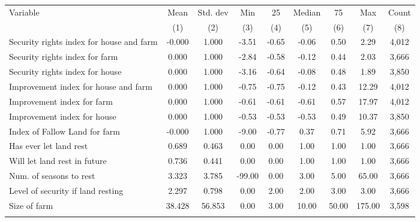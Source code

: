 \begin{tabular}{lcccccccc}
\hline \noalign{\smallskip}Variable & Mean & Std. dev & Min & 25 & Median & 75 & Max & Count\\
 & (1) & (2) & (3) & (4) & (5) & (6) & (7) & (8)\\
\noalign{\smallskip}\hline \noalign{\smallskip}Security rights index for house and farm & -0.000 & 1.000 & -3.51 & -0.65 & -0.06 & 0.50 & 2.29 & 4,012\\
\quad Security rights index for farm & 0.000 & 1.000 & -2.84 & -0.58 & -0.12 & 0.44 & 2.03 & 3,666\\
\quad Security rights index for house & 0.000 & 1.000 & -3.16 & -0.64 & -0.08 & 0.48 & 1.89 & 3,850\\
Improvement index for house and farm & 0.000 & 1.000 & -0.75 & -0.75 & -0.12 & 0.43 & 12.29 & 4,012\\
\quad Improvement index for farm & 0.000 & 1.000 & -0.61 & -0.61 & -0.61 & 0.57 & 17.97 & 4,012\\
\quad Improvement index for house & 0.000 & 1.000 & -0.53 & -0.53 & -0.53 & 0.49 & 10.37 & 3,850\\
Index of Fallow Land for farm & -0.000 & 1.000 & -9.00 & -0.77 & 0.37 & 0.71 & 5.92 & 3,666\\
\quad Has ever let land rest & 0.689 & 0.463 & 0.00 & 0.00 & 1.00 & 1.00 & 1.00 & 3,666\\
\quad Will let land rest in future & 0.736 & 0.441 & 0.00 & 0.00 & 1.00 & 1.00 & 1.00 & 3,666\\
\quad Num. of seasons to rest & 3.323 & 3.785 & -99.00 & 0.00 & 3.00 & 5.00 & 65.00 & 3,666\\
\quad Level of security if land resting & 2.297 & 0.798 & 0.00 & 2.00 & 2.00 & 3.00 & 3.00 & 3,666\\
Size of farm & 38.428 & 56.853 & 0.00 & 3.00 & 10.00 & 50.00 & 175.00 & 3,598\\
\noalign{\smallskip}\hline\end{tabular}
